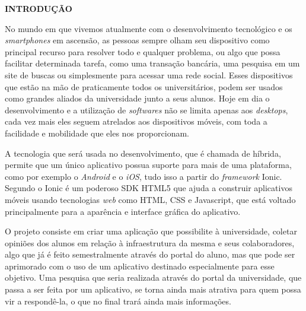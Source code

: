 \vspace{1.2em}
\textbf{\large INTRODUÇÃO}

\vspace{2.9em}
\thispagestyle{empty}


	\par No mundo em que vivemos atualmente com o desenvolvimento tecnológico e os \textit{smartphones} em ascensão, as pessoas sempre olham seu dispositivo como principal recurso para resolver todo e qualquer problema, ou algo que possa facilitar determinada tarefa, como uma transação bancária, uma pesquisa em um site de buscas ou simplesmente para acessar uma rede social. Esses dispositivos que estão na mão de praticamente todos os universitários, podem ser usados como grandes aliados da universidade junto a seus alunos. Hoje em dia o desenvolvimento e a utilização de \textit{softwares} não se limita apenas aos \textit{desktops}, cada vez mais eles seguem atrelados aos dispositivos móveis, com toda a facilidade e mobilidade que eles nos proporcionam.

	\par A tecnologia que será usada no desenvolvimento, que é chamada de híbrida, permite que um único aplicativo possua suporte para mais de uma plataforma, como por exemplo o \textit{Android} e o \textit{iOS}, tudo isso a partir do \textit{framework} Ionic. Segundo  o Ionic é um poderoso SDK HTML5 que ajuda a construir aplicativos móveis usando tecnologias \textit{web} como HTML, CSS e Javascript, que está voltado principalmente para a aparência e interface gráfica do aplicativo.

	\par O projeto consiste em criar uma aplicação que possibilite à universidade, coletar opiniões dos alunos em relação à infraestrutura da mesma e seus colaboradores, algo que já é feito semestralmente através do portal do aluno, mas que pode ser aprimorado com o uso de um aplicativo destinado especialmente para esse objetivo. Uma pesquisa que seria realizada através do portal da universidade, que passa a ser feita por um aplicativo, se torna ainda mais atrativa para quem possa vir a respondê-la, o que no final trará ainda mais informações.

